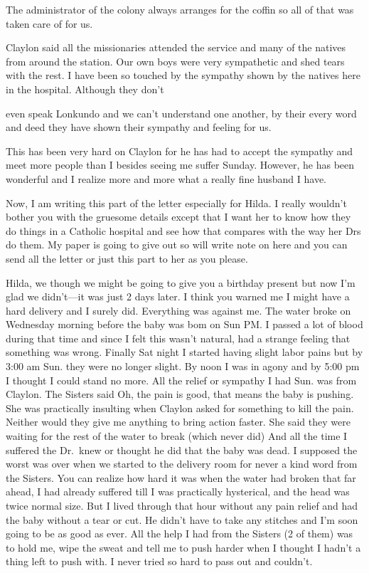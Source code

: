 \documentclass[
]{book}
\begin{document}
The administrator of the colony always arranges for the coffin so all of that was taken care of for us.

Claylon said all the missionaries attended the service and many of the natives from around the station. Our own boys were very sympathetic and shed tears with the rest. I have been so touched by the sympathy shown by the natives here in the hospital. Although they don't

even speak Lonkundo and we can't understand one another, by their every word and deed they have shown their sympathy and feeling for us.

This has been very hard on Claylon for he has had to accept the sympathy and meet more people than I besides seeing me suffer Sunday. However, he has been wonderful and I realize more and more what a really fine husband I have.

Now, I am writing this part of the letter especially for Hilda. I really wouldn't bother you with the gruesome details except that I want her to know how they do things in a Catholic hospital and see how that compares with the way her Drs do them. My paper is going to give out so will write note on here and you can send all the letter or just this part to her as you please.

Hilda, we though we might be going to give you a birthday present but now I'm glad we didn't---it was just 2 days later. I think you warned me I might have a hard delivery and I surely did. Everything was against me. The water broke on Wednesday morning before the baby was bom on Sun PM. I passed a lot of blood during that time and since I felt this wasn't natural, had a strange feeling that something was wrong. Finally Sat night I started having slight labor pains but by 3:00 am Sun. they were no longer slight. By noon I was in agony and by 5:00 pm I thought I could stand no more. All the relief or sympathy I had Sun. was from Claylon. The Sisters said Oh, the pain is good, that means the baby is pushing. She was practically insulting when Claylon asked for something to kill the pain. Neither would they give me anything to bring action faster. She said they were waiting for the rest of the water to break (which never did) And all the time I suffered the Dr.~knew or thought he did that the baby was dead. I supposed the worst was over when we started to the delivery room for never a kind word from the Sisters. You can realize how hard it was when the water had broken that far ahead, I had already suffered till I was practically hysterical, and the head was twice normal size. But I lived through that hour without any pain relief and had the baby without a tear or cut. He didn't have to take any stitches and I'm soon going to be as good as ever. All the help I had from the Sisters (2 of them) was to hold me, wipe the sweat and tell me to push harder when I thought I hadn't a thing left to push with. I never tried so hard to pass out and couldn't.
\end{document}
